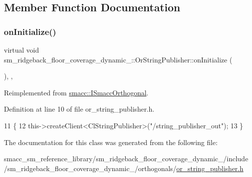 \subsection{Member Function Documentation}
\mbox{\label{classsm__ridgeback__floor__coverage__dynamic__1_1_1OrStringPublisher_ab9147f2ca673acef0f48df517bf8be39}} 
\subsubsection{\texorpdfstring{on\+Initialize()}{onInitialize()}}
{\footnotesize\ttfamily virtual void sm\+\_\+ridgeback\+\_\+floor\+\_\+coverage\+\_\+dynamic\+\_\+::\+Or\+String\+Publisher\+::on\+Initialize (\begin{DoxyParamCaption}{ }\end{DoxyParamCaption})\hspace{0.3cm}{\ttfamily [inline]}, {\ttfamily [override]}, {\ttfamily [virtual]}}



Reimplemented from \hyperlink{classsmacc_1_1ISmaccOrthogonal_a6bb31c620cb64dd7b8417f8705c79c7a}{smacc\+::\+I\+Smacc\+Orthogonal}.



Definition at line 10 of file or\+\_\+string\+\_\+publisher.\+h.


\begin{DoxyCode}
11     \{
12         this->createClient<ClStringPublisher>(\textcolor{stringliteral}{"/string\_publisher\_out"});
13     \}
\end{DoxyCode}


The documentation for this class was generated from the following file\+:\begin{DoxyCompactItemize}
\item 
smacc\+\_\+sm\+\_\+reference\+\_\+library/sm\+\_\+ridgeback\+\_\+floor\+\_\+coverage\+\_\+dynamic\+\_/include/sm\+\_\+ridgeback\+\_\+floor\+\_\+coverage\+\_\+dynamic\+\_/orthogonals/\hyperlink{sm__ridgeback__floor__coverage__dynamic__1_2include_2sm__ridgeback__floor__coverage__dynamic__1_f9de88b21abca6ff265685bfe436a4bf}{or\+\_\+string\+\_\+publisher.\+h}\end{DoxyCompactItemize}
